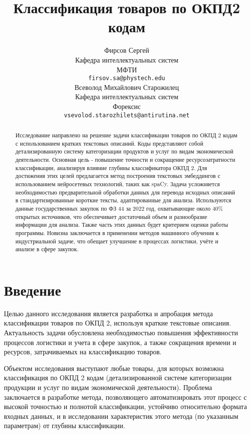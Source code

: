 \documentclass{article}
\title{Классификация товаров по ОКПД2 кодам}
\author{ Фирсов Сергей \\
        Кафедра интеллектуальных систем\\
	МФТИ\\
	\texttt{firsov.sa@phystech.edu} \\
	\And
	Всеволод Михайлович Старожилец \\
	Кафедра интеллектуальных систем\\
	Форексис\\
	\texttt{vsevolod.starozhilets@antirutina.net} \\
}
\date{}
\begin{document}
\maketitle

\begin{abstract}
    Исследование направлено на решение задачи классификации товаров по ОКПД 2 кодам с использованием кратких текстовых описаний. Коды представляют собой детализированную систему категоризации продуктов и услуг по видам экономической деятельности. Основная цель - повышение точности и сокращение ресурсозатратности классификации, анализируя влияние глубины классификатора ОКПД 2. Для достижения этих целей предлагается метод построения текстовых эмбеддингов с использованием нейросетевых технологий, таких как spaCy. Задача усложняется необходимостью предварительной обработки данных для перевода исходных описаний в стандартизированные короткие тексты, адаптированные для анализа. Используются данные государственных закупок по ФЗ 44 за 2022 год, охватывающие около 40\% открытых источников, что обеспечивает достаточный объем и разнообразие информации для анализа. Также часть этих данных будет критерием оценки работы программы. Новизна заключается в применении методов машинного обучения к индустриальной задаче, что обещает улучшение в процессах логистики, учёте и анализе в сфере закупок. 


 
\end{abstract}



\section{Введение}

Целью данного исследования является разработка и апробация метода классификации товаров по ОКПД 2, используя краткие текстовые описания. Актуальность задачи обусловлена необходимостью повышения эффективности процессов логистики и учета в сфере закупок, а также сокращения времени и ресурсов, затрачиваемых на классификацию товаров.

Объектом исследования выступают любые товары, для которых возможна классификация по ОКПД 2 кодам (детализированной системе категоризации продукции и услуг по видам экономической деятельности). Проблема заключается в разработке метода, позволяющего автоматизировать этот процесс с высокой точностью и полнотой классификации, устойчиво относительно формата входных данных, и в исследовании характеристик этого метода (по указанным параметрам) от глубины классификации.
\end{document}
